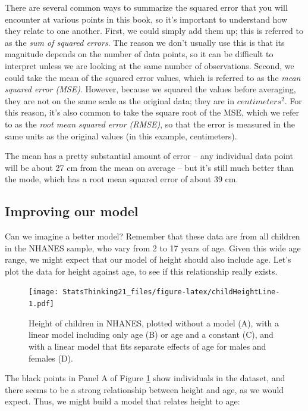 \documentclass[
  12pt,
]{book}
\begin{document}
There are several common ways to summarize the squared error that you will encounter at various points in this book, so it's important to understand how they relate to one another. First, we could simply add them up; this is referred to as the \emph{sum of squared errors}. The reason we don't usually use this is that its magnitude depends on the number of data points, so it can be difficult to interpret unless we are looking at the same number of observations. Second, we could take the mean of the squared error values, which is referred to as the \emph{mean squared error (MSE)}. However, because we squared the values before averaging, they are not on the same scale as the original data; they are in \(centimeters^2\). For this reason, it's also common to take the square root of the MSE, which we refer to as the \emph{root mean squared error (RMSE)}, so that the error is measured in the same units as the original values (in this example, centimeters).

The mean has a pretty substantial amount of error -- any individual data point will be about 27 cm from the mean on average -- but it's still much better than the mode, which has a root mean squared error of about 39 cm.

\hypertarget{improving-our-model}{%
\subsection{Improving our model}\label{improving-our-model}}

Can we imagine a better model? Remember that these data are from all children in the NHANES sample, who vary from 2 to 17 years of age. Given this wide age range, we might expect that our model of height should also include age. Let's plot the data for height against age, to see if this relationship really exists.

\begin{figure}
\centering
\texttt{[image: StatsThinking21\_files/figure-latex/childHeightLine-1.pdf]}
\caption{\label{fig:childHeightLine}Height of children in NHANES, plotted without a model (A), with a linear model including only age (B) or age and a constant (C), and with a linear model that fits separate effects of age for males and females (D).}
\end{figure}

The black points in Panel A of Figure \ref{fig:childHeightLine} show individuals in the dataset, and there seems to be a strong relationship between height and age, as we would expect. Thus, we might build a model that relates height to age:
\end{document}
